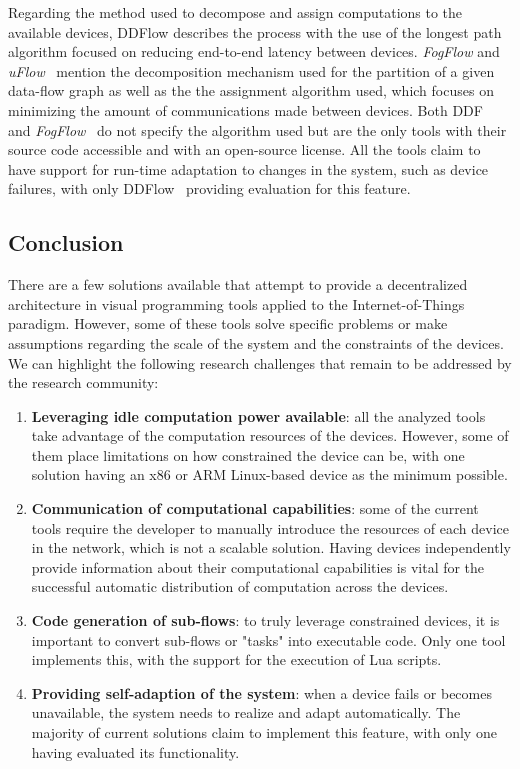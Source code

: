 Regarding the method used to decompose and assign computations to the available devices, DDFlow describes the process with the use of the longest path algorithm focused on reducing end-to-end latency between devices. \textit{FogFlow} and \textit{uFlow}~\cite{fog_flow,flow_based_programming_fog} mention the decomposition mechanism used for the partition of a given data-flow graph as well as the the assignment algorithm used, which focuses on minimizing the amount of communications made between devices. Both DDF~\cite{ddf} and \textit{FogFlow}~\cite{fog_flow_easy,fog_flow_tool} do not specify the algorithm used but are the only tools with their source code accessible and with an open-source license. All the tools claim to have support for run-time adaptation to changes in the system, such as device failures, with only DDFlow~\cite{ddflow} providing evaluation for this feature.


\subsection{Conclusion}\label{sec:decentralized_sota_conclusion}

There are a few solutions available that attempt to provide a decentralized architecture in visual programming tools applied to the Internet-of-Things paradigm. However, some of these tools solve specific problems or make assumptions regarding the scale of the system and the constraints of the devices. We can highlight the following research challenges that remain to be addressed by the research community:

\begin{enumerate}
    \item \textbf{Leveraging idle computation power available}: all the analyzed tools take advantage of the computation resources of the devices. However, some of them place limitations on how constrained the device can be, with one solution having an x86 or ARM Linux-based device as the minimum possible.
    \item \textbf{Communication of computational capabilities}: some of the current tools require the developer to manually introduce the resources of each device in the network, which is not a scalable solution. Having devices independently provide information about their computational capabilities is vital for the successful automatic distribution of computation across the devices.
    \item \textbf{Code generation of sub-flows}: to truly leverage constrained devices, it is important to convert sub-flows or "tasks" into executable code. Only one tool implements this, with the support for the execution of Lua scripts.
    \item \textbf{Providing self-adaption of the system}: when a device fails or becomes unavailable, the system needs to realize and adapt automatically. The majority of current solutions claim to implement this feature, with only one having evaluated its functionality.
\end{enumerate}

